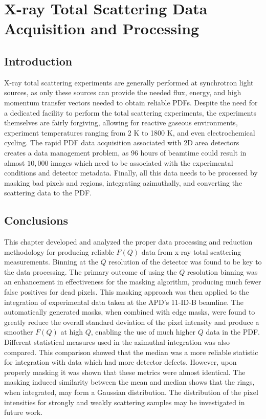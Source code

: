 \graphicspath{{dp/figures/}}
\chapter{X-ray Total Scattering Data Acquisition and Processing} \label{ch:dp}
\section{Introduction}
X-ray total scattering experiments are generally performed at synchrotron light sources, as only these sources can provide the needed flux, energy, and high momentum transfer vectors needed to obtain reliable PDFs. \cite{Chupas2003, Dykhne2011}
Despite the need for a dedicated facility to perform the total scattering experiments, the experiments themselves are fairly forgiving, allowing for reactive gaseous environments, experiment temperatures ranging from 2 \si{K} to 1800 \si{K}, and even electrochemical cycling. \cite{Chupas2008, Petkov2013, Redmond2012}
The rapid PDF data acquisition associated with 2D area detectors creates a data management problem, as 96 hours of beamtime could result in almost $10,000$ images which need to be associated with the experimental conditions and detector metadata. \cite{Chupas2003}
 Finally, all this data needs to be processed by masking bad pixels and regions, integrating azimuthally, and converting the scattering data to the PDF. \cite{Kieffer2013, Juhas2013, Yang2014, Pauw2014, Billinge2012}

%







\section{Conclusions}
This chapter developed and analyzed the proper data processing and reduction methodology for producing reliable $F(Q)$ data from x-ray total scattering measurements.
Binning at the $Q$ resolution of the detector was found to be key to the data processing.
The primary outcome of using the $Q$ resolution binning was an enhancement in effectiveness for the masking algorithm, producing much fewer false positives for dead pixels.
This masking approach was then applied to the integration of experimental data taken at the APD's 11-ID-B beamline.
The automatically generated masks, when combined with edge masks, were found to greatly reduce the overall standard deviation of the pixel intensity and produce a smoother $F(Q)$ at high $Q$, enabling the use of much higher $Q$ data in the PDF.
Different statistical measures used in the azimuthal integration was also compared.
This comparison showed that the median was a more reliable statistic for integration with data which had more detector defects.
However, upon properly masking it was shown that these metrics were almost identical.
The masking induced similarity between the mean and median shows that the rings, when integrated, may form a Gaussian distribution.
The distribution of the pixel intensities for strongly and weakly scattering samples may be investigated in future work.